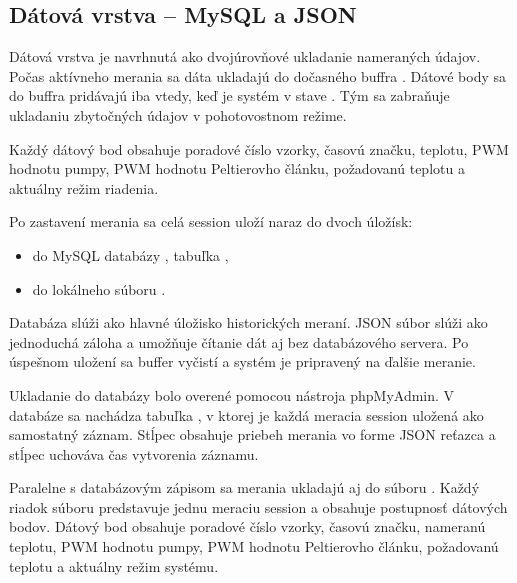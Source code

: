 \subsection{Dátová vrstva -- MySQL a JSON}

Dátová vrstva je navrhnutá ako dvojúrovňové ukladanie nameraných údajov. 
Počas aktívneho merania sa dáta ukladajú do dočasného buffra . 
Dátové body sa do buffra pridávajú iba vtedy, keď je systém v stave . 
Tým sa zabraňuje ukladaniu zbytočných údajov v pohotovostnom režime.

Každý dátový bod obsahuje poradové číslo vzorky, časovú značku, teplotu, 
PWM hodnotu pumpy, PWM hodnotu Peltierovho článku, požadovanú teplotu a aktuálny režim riadenia.

Po zastavení merania sa celá session uloží naraz do dvoch úložísk:

\begin{itemize}
    \item do MySQL databázy , tabuľka ,
    \item do lokálneho súboru .
\end{itemize}

Databáza slúži ako hlavné úložisko historických meraní. JSON súbor slúži ako 
jednoduchá záloha a umožňuje čítanie dát aj bez databázového servera. 
Po úspešnom uložení sa buffer vyčistí a systém je pripravený na ďalšie meranie.

Ukladanie do databázy bolo overené pomocou nástroja phpMyAdmin. V databáze sa nachádza 
tabuľka , v ktorej je každá meracia session uložená ako samostatný záznam. 
Stĺpec  obsahuje priebeh merania vo forme JSON reťazca a stĺpec 
 uchováva čas vytvorenia záznamu.

\begin{figure}[H]
    \centering
    \label{fig:databaza_mysql}
\end{figure}

Paralelne s databázovým zápisom sa merania ukladajú aj do súboru . 
Každý riadok súboru predstavuje jednu meraciu session a obsahuje postupnosť dátových bodov. 
Dátový bod obsahuje poradové číslo vzorky, časovú značku, nameranú teplotu, PWM hodnotu pumpy, 
PWM hodnotu Peltierovho článku, požadovanú teplotu a aktuálny režim systému.

